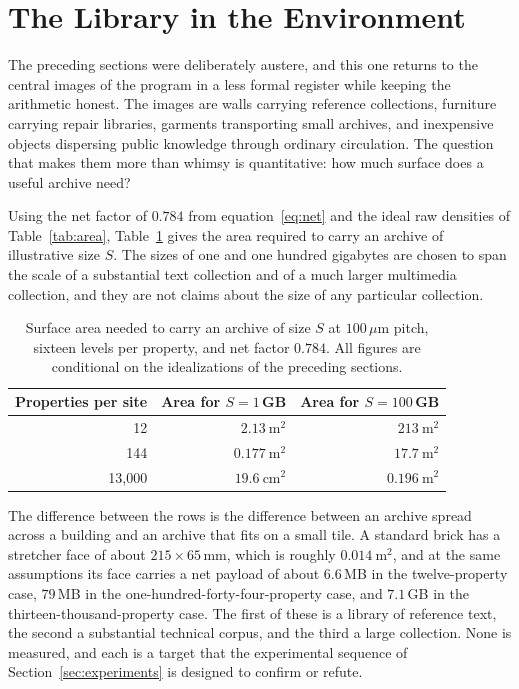 \section{The Library in the Environment}\label{sec:popular}

The preceding sections were deliberately austere, and this one returns to the central images of the program in a less formal register while keeping the arithmetic honest. The images are walls carrying reference collections, furniture carrying repair libraries, garments transporting small archives, and inexpensive objects dispersing public knowledge through ordinary circulation. The question that makes them more than whimsy is quantitative: how much surface does a useful archive need?

Using the net factor of $0.784$ from equation~\eqref{eq:net} and the ideal raw densities of Table~\ref{tab:area}, Table~\ref{tab:area-needed} gives the area required to carry an archive of illustrative size $S$. The sizes of one and one hundred gigabytes are chosen to span the scale of a substantial text collection and of a much larger multimedia collection, and they are not claims about the size of any particular collection.

\begin{table}[h]
\centering
\small
\begin{tabular}{@{}rrr@{}}
\toprule
Properties per site & Area for $S=1$\,GB & Area for $S=100$\,GB \\
\midrule
12 & $2.13\ \mathrm{m^2}$ & $213\ \mathrm{m^2}$ \\
144 & $0.177\ \mathrm{m^2}$ & $17.7\ \mathrm{m^2}$ \\
13{,}000 & $19.6\ \mathrm{cm^2}$ & $0.196\ \mathrm{m^2}$ \\
\bottomrule
\end{tabular}
\caption{Surface area needed to carry an archive of size $S$ at $100\,\mu\mathrm m$ pitch, sixteen levels per property, and net factor $0.784$. All figures are conditional on the idealizations of the preceding sections.}
\label{tab:area-needed}
\end{table}

The difference between the rows is the difference between an archive spread across a building and an archive that fits on a small tile. A standard brick has a stretcher face of about $215\times65$\,mm, which is roughly $0.014\ \mathrm{m^2}$, and at the same assumptions its face carries a net payload of about $6.6$\,MB in the twelve-property case, $79$\,MB in the one-hundred-forty-four-property case, and $7.1$\,GB in the thirteen-thousand-property case. The first of these is a library of reference text, the second a substantial technical corpus, and the third a large collection. None is measured, and each is a target that the experimental sequence of Section~\ref{sec:experiments} is designed to confirm or refute.


